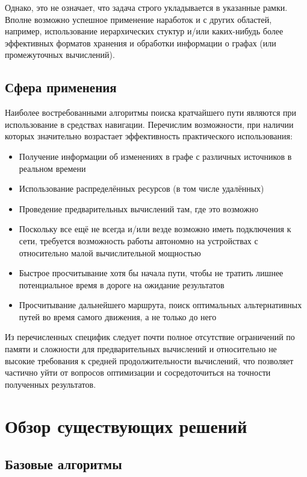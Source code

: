 \documentclass[12pt]{article}
\begin{document}
Однако, это не означает, что задача строго укладывается в указанные рамки. Вполне возможно успешное применение наработок и с других областей, например, использование иерархических стуктур и/или каких-нибудь более эффективных форматов хранения и обработки информации о графах (или промежуточных вычислений).

\subsection{Сфера применения}

Наиболее востребованными алгоритмы поиска кратчайшего пути являются при использование в средствах навигации. Перечислим возможности, при наличии которых значительно возрастает эффективность практического использования:

\begin{itemize}
  \item Получение информации об изменениях в графе с различных источников в реальном времени
  \item Использование распределённых ресурсов (в том числе удалённых)
  \item Проведение предварительных вычислений там, где это возможно
  \item Поскольку все ещё не всегда и/или везде возможно иметь подключения к сети, требуется возможность работы автономно на устройствах с относительно малой вычислительной мощностью
  \item Быстрое просчитывание хотя бы начала пути, чтобы не тратить лишнее потенциальное время в дороге на ожидание результатов
  \item Просчитывание дальнейшего маршрута, поиск оптимальных альтернативных путей во время самого движения, а не только до него
\end{itemize}

Из перечисленных специфик следует почти полное отсутствие ограничений по памяти и сложности для предварительных вычислений и относительно не высокие требования к средней продолжительности вычислений, что позволяет частично уйти от вопросов оптимизации и сосредоточиться на точности полученных результатов.

\section{Обзор существующих решений}

\subsection{Базовые алгоритмы}
\end{document}
